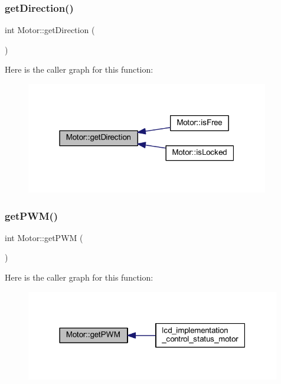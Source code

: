 \mbox{\label{class_motor_a0d8f99a56a3e07f49630e3024be91048}} 
\subsubsection{\texorpdfstring{get\+Direction()}{getDirection()}}
{\footnotesize\ttfamily int Motor\+::get\+Direction (\begin{DoxyParamCaption}{ }\end{DoxyParamCaption})}

Here is the caller graph for this function\+:
\nopagebreak
\begin{figure}[H]
\begin{center}
\leavevmode
\includegraphics[width=301pt]{d1/d6b/class_motor_a0d8f99a56a3e07f49630e3024be91048_icgraph}
\end{center}
\end{figure}
\mbox{\label{class_motor_accde7c9759aaef803f9d5d6d4ec229e6}} 
\subsubsection{\texorpdfstring{get\+P\+W\+M()}{getPWM()}}
{\footnotesize\ttfamily int Motor\+::get\+P\+WM (\begin{DoxyParamCaption}{ }\end{DoxyParamCaption})}

Here is the caller graph for this function\+:
\nopagebreak
\begin{figure}[H]
\begin{center}
\leavevmode
\includegraphics[width=315pt]{d1/d6b/class_motor_accde7c9759aaef803f9d5d6d4ec229e6_icgraph}
\end{center}
\end{figure}
\mbox{\label{class_motor_a4d03ea62bd9f5579d4fbe16d10462962}} 
